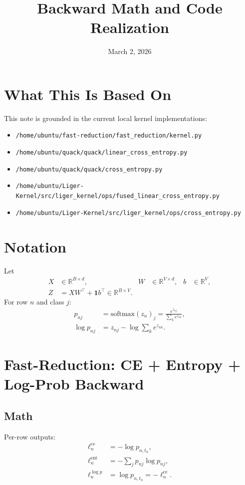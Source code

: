 \documentclass[11pt]{article}
\title{Backward Math and Code Realization}
\date{March 2, 2026}
\begin{document}
\maketitle

\section{What This Is Based On}
This note is grounded in the current local kernel implementations:
\begin{itemize}
\item \texttt{/home/ubuntu/fast-reduction/fast\_reduction/kernel.py}
\item \texttt{/home/ubuntu/quack/quack/linear\_cross\_entropy.py}
\item \texttt{/home/ubuntu/quack/quack/cross\_entropy.py}
\item \texttt{/home/ubuntu/Liger-Kernel/src/liger\_kernel/ops/fused\_linear\_cross\_entropy.py}
\item \texttt{/home/ubuntu/Liger-Kernel/src/liger\_kernel/ops/cross\_entropy.py}
\end{itemize}

\section{Notation}
Let
\begin{align}
X &\in \mathbb{R}^{B \times d}, &
W &\in \mathbb{R}^{V \times d}, &
b &\in \mathbb{R}^{V}, \\
Z &= XW^\top + \mathbf{1}b^\top \in \mathbb{R}^{B \times V}.
\end{align}
For row $n$ and class $j$:
\begin{align}
p_{nj} &= \mathrm{softmax}(z_n)_j
= \frac{e^{z_{nj}}}{\sum_k e^{z_{nk}}}, \\
\log p_{nj} &= z_{nj} - \log \sum_k e^{z_{nk}}.
\end{align}

\section{Fast-Reduction: CE + Entropy + Log-Prob Backward}
\subsection{Math}
Per-row outputs:
\begin{align}
\ell_n^{\mathrm{ce}} &= -\log p_{n,t_n}, \\
\ell_n^{\mathrm{ent}} &= -\sum_j p_{nj}\log p_{nj}, \\
\ell_n^{\log p} &= \log p_{n,t_n} = -\ell_n^{\mathrm{ce}}.
\end{align}
\end{document}
